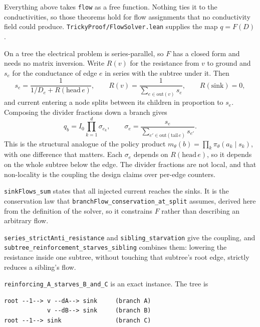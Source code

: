 \documentclass[11pt,a4paper]{article}
\theoremstyle{definition}
\newcommand{\lean}[1]{\texttt{#1}}
\begin{document}
Everything above takes \lean{flow} as a free function. Nothing ties it to the
conductivities, so those theorems hold for flow assignments that no
conductivity field could produce. \lean{TrickyProof/FlowSolver.lean} supplies
the map $q = F(D)$.

On a tree the electrical problem is series-parallel, so $F$ has a closed form
and needs no matrix inversion. Write $R(v)$ for the resistance from $v$ to
ground and $s_e$ for the conductance of edge $e$ in series with the subtree
under it. Then
\begin{equation}
  s_e = \frac{1}{1/D_e + R(\mathrm{head}\, e)},
  \qquad
  R(v) = \frac{1}{\sum_{e \in \mathrm{out}(v)} s_e},
  \qquad
  R(\mathrm{sink}) = 0 ,
  \label{eq:solver}
\end{equation}
and current entering a node splits between its children in proportion to
$s_e$. Composing the divider fractions down a branch gives
\begin{equation}
  q_b = I_0 \prod_{k=1}^{d} \sigma_{e_k},
  \qquad
  \sigma_e = \frac{s_e}{\sum_{e' \in \mathrm{out}(\mathrm{tail}\, e)} s_{e'}} .
\end{equation}
This is the structural analogue of the policy product
$m_\theta(b) = \prod_k \pi_\theta(a_k \mid s_k)$, with one difference that
matters. Each $\sigma_e$ depends on $R(\mathrm{head}\, e)$, so it depends on
the whole subtree below the edge. The divider fractions are not local, and
that non-locality is the coupling the design claims over per-edge counters.

\lean{sinkFlows\_sum} states that all injected current reaches the sinks. It
is the conservation law that \lean{branchFlow\_conservation\_at\_split}
assumes, derived here from the definition of the solver, so it constrains $F$
rather than describing an arbitrary flow.

\lean{series\_strictAnti\_resistance} and \lean{sibling\_starvation} give the
coupling, and \lean{subtree\_reinforcement\_starves\_sibling} combines them:
lowering the resistance inside one subtree, without touching that subtree's
root edge, strictly reduces a sibling's flow.

\lean{reinforcing\_A\_starves\_B\_and\_C} is an exact instance. The tree is

\begin{Verbatim}[fontsize=\small,xleftmargin=1em]
root --1--> v --dA--> sink     (branch A)
            v --dB--> sink     (branch B)
root --1--> sink               (branch C)
\end{Verbatim}
\end{document}
